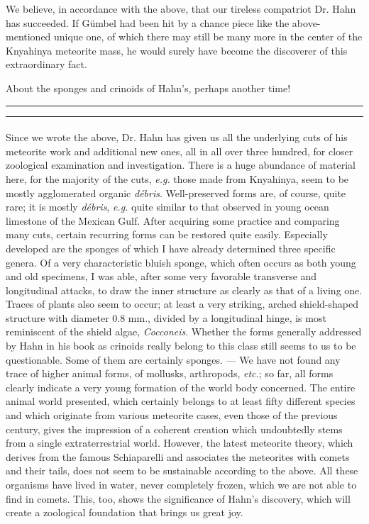 \documentclass[a4paper, 12pt, oneside]{article}
\begin{document}
We believe, in accordance with the above, that our tireless compatriot Dr. Hahn has succeeded. If Gümbel had been hit by a chance piece like the above-mentioned unique one, of which there may still be many more in the center of the Knyahinya meteorite mass, he would surely have become the discoverer of this extraordinary fact.

About the sponges and crinoids of Hahn's, perhaps another time!

\hspace*{-6mm}\rule{\textwidth}{1.6pt}\vspace*{-\baselineskip}\vspace*{2pt} %
\hspace*{0mm}\rule{\textwidth}{0.4pt} %

\paragraph*{}
Since we wrote the above, Dr. Hahn has given us all the underlying cuts of his meteorite work and additional new ones, all in all over three hundred, for closer zoological examination and investigation. There is a huge abundance of material here, for the majority of the cuts, \emph{e.g.} those made from Knyahinya, seem to be mostly agglomerated organic \emph{débris}. Well-preserved forms are, of course, quite rare; it is mostly \emph{débris}, \emph{e.g.} quite similar to that observed in young ocean limestone of the Mexican Gulf. After acquiring some practice and comparing many cuts, certain recurring forms can be restored quite easily. Especially developed are the sponges of which I have already determined three specific genera. Of a very characteristic bluish sponge, which often occurs as both young and old specimens, I was able, after some very favorable transverse and longitudinal attacks, to draw the inner structure as clearly as that of a living one. Traces of plants also seem to occur; at least a very striking, arched shield-shaped structure with diameter 0.8 mm., divided by a longitudinal hinge, is most reminiscent of the shield algae, \emph{Cocconeis}. Whether the forms generally addressed by Hahn in his book as crinoids really belong to this class still seems to us to be questionable. Some of them are certainly sponges. --- We have not found any trace of higher animal forms, of mollusks, arthropods, \emph{etc.}; so far, all forms clearly indicate a very young formation of the world body concerned. The entire animal world presented, which certainly belongs to at least fifty different species and which originate from various meteorite cases, even those of the previous century, gives the impression of a coherent creation which undoubtedly stems from a single extraterrestrial world. However, the latest meteorite theory, which derives from the famous Schiaparelli and associates the meteorites with comets and their tails, does not seem to be sustainable according to the above. All these organisms have lived in water, never completely frozen, which we are not able to find in comets. This, too, shows the significance of Hahn's discovery, which will create a zoological foundation that brings us great joy.
\clearpage
\end{document}
